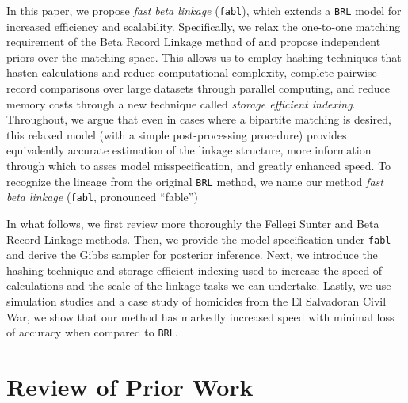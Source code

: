 \documentclass[12pt,letterpaper]{article}
\newcommand{\1}[1]{\mathbb{I}\!\left[#1\right]} %
\begin{document}
{	In this paper, we propose \emph{fast beta linkage} (\texttt{fabl}), which extends a \texttt{BRL} model for increased efficiency and scalability. Specifically, we relax the one-to-one matching requirement of the Beta Record Linkage method of \citep{sadinle_bayesian_2017} and propose independent priors over the matching space. This allows us to employ hashing techniques that hasten calculations and reduce computational complexity, complete pairwise record comparisons over large datasets through parallel computing, and reduce memory costs through a new technique called \emph{storage efficient indexing}. Throughout, we argue that even in cases where a bipartite matching is desired, this relaxed model (with a simple post-processing procedure) provides equivalently accurate estimation of the linkage structure, more information through which to asses model misspecification, and greatly enhanced speed. To recognize the lineage from the original \texttt{BRL} method, we name our method \emph{fast beta linkage} (\texttt{fabl},
	pronounced ``fable'')
	
	In what follows, we first review more thoroughly the Fellegi Sunter and Beta Record Linkage methods. Then, we provide the model specification under \texttt{fabl} and derive the Gibbs sampler for posterior inference. Next, we introduce the hashing technique and storage efficient indexing used to increase the speed of calculations and the scale of the linkage tasks we can undertake. Lastly, we use simulation studies and a case study of homicides from the El Salvadoran Civil War, we show that our method has markedly increased speed with minimal loss of accuracy when compared to \texttt{BRL}.
	

\section{Review of Prior Work}
\label{sec:review-of_prior-work}

}
\end{document}
